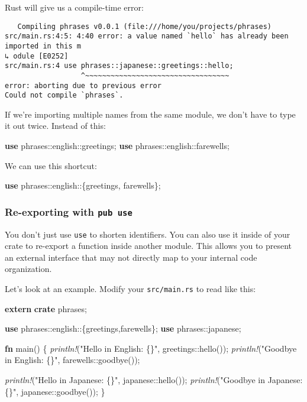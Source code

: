 \documentclass[a4paper,]{book}
\newenvironment{Shaded}{\begin{snugshade}}{\end{snugshade}}
\newcommand{\KeywordTok}[1]{\textcolor[rgb]{0.13,0.29,0.53}{\textbf{{#1}}}}
\newcommand{\StringTok}[1]{\textcolor[rgb]{0.31,0.60,0.02}{{#1}}}
\newcommand{\PreprocessorTok}[1]{\textcolor[rgb]{0.56,0.35,0.01}{\textit{{#1}}}}
\newcommand{\NormalTok}[1]{{#1}}
\begin{document}
Rust will give us a compile-time error:

\begin{verbatim}
   Compiling phrases v0.0.1 (file:///home/you/projects/phrases)
src/main.rs:4:5: 4:40 error: a value named `hello` has already been imported in this m
↳ odule [E0252]
src/main.rs:4 use phrases::japanese::greetings::hello;
                  ^~~~~~~~~~~~~~~~~~~~~~~~~~~~~~~~~~~
error: aborting due to previous error
Could not compile `phrases`.
\end{verbatim}

If we're importing multiple names from the same module, we don't have to
type it out twice. Instead of this:

\begin{Shaded}
\begin{Highlighting}[]
\KeywordTok{use} \NormalTok{phrases::english::greetings;}
\KeywordTok{use} \NormalTok{phrases::english::farewells;}
\end{Highlighting}
\end{Shaded}

We can use this shortcut:

\begin{Shaded}
\begin{Highlighting}[]
\KeywordTok{use} \NormalTok{phrases::english::\{greetings, farewells\};}
\end{Highlighting}
\end{Shaded}

\subsubsection{\texorpdfstring{Re-exporting with
\texttt{pub\ use}}{Re-exporting with pub use}}\label{re-exporting-with-pub-use}

You don't just use \texttt{use} to shorten identifiers. You can also use
it inside of your crate to re-export a function inside another module.
This allows you to present an external interface that may not directly
map to your internal code organization.

Let's look at an example. Modify your \texttt{src/main.rs} to read like
this:

\begin{Shaded}
\begin{Highlighting}[]
\KeywordTok{extern} \KeywordTok{crate} \NormalTok{phrases;}

\KeywordTok{use} \NormalTok{phrases::english::\{greetings,farewells\};}
\KeywordTok{use} \NormalTok{phrases::japanese;}

\KeywordTok{fn} \NormalTok{main() \{}
    \PreprocessorTok{println!}\NormalTok{(}\StringTok{"Hello in English: \{\}"}\NormalTok{, greetings::hello());}
    \PreprocessorTok{println!}\NormalTok{(}\StringTok{"Goodbye in English: \{\}"}\NormalTok{, farewells::goodbye());}

    \PreprocessorTok{println!}\NormalTok{(}\StringTok{"Hello in Japanese: \{\}"}\NormalTok{, japanese::hello());}
    \PreprocessorTok{println!}\NormalTok{(}\StringTok{"Goodbye in Japanese: \{\}"}\NormalTok{, japanese::goodbye());}
\NormalTok{\}}
\end{Highlighting}
\end{Shaded}
\end{document}
